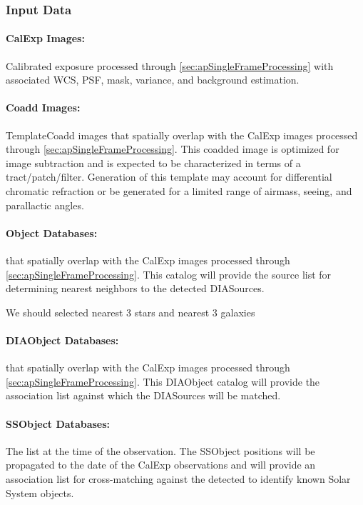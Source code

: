 \subsubsection{Input Data}
\label{sec:apADInput}

\paragraph*{CalExp Images:} Calibrated exposure processed through \ref{sec:apSingleFrameProcessing} with associated WCS, PSF, mask, variance, and background estimation.

\paragraph*{Coadd Images:} TemplateCoadd images that spatially overlap with the CalExp images processed through \ref{sec:apSingleFrameProcessing}. This coadded image is optimized for image subtraction and is expected to be characterized in terms of a tract/patch/filter. Generation of this template may account for differential chromatic refraction or be generated for a limited range of airmass, seeing, and parallactic angles.

\paragraph*{Object Databases:} \Objects that spatially overlap with the CalExp images processed through \ref{sec:apSingleFrameProcessing}. This \Object catalog will provide the source list for determining nearest neighbors to the detected DIASources. 

\begin{note} We should selected nearest 3 stars and nearest 3 galaxies \end{note}

\paragraph*{DIAObject Databases:} \DIAObjects that spatially overlap with the CalExp images processed through \ref{sec:apSingleFrameProcessing}. This DIAObject catalog will provide the association  list against which the DIASources will be matched. 

\paragraph*{SSObject Databases:} The \SSObject list at the time of the observation. The SSObject positions will be propagated to the date of the CalExp observations and will provide an association  list for cross-matching against the detected \DIASources to identify known Solar System objects.

